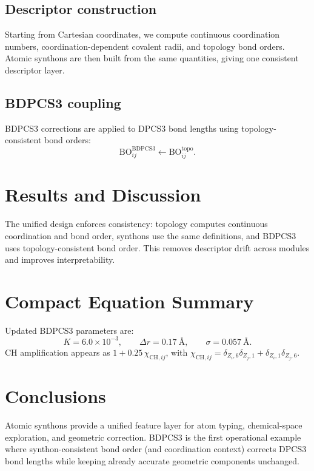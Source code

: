 \documentclass[journal=jctcce,manuscript=article]{achemso}
\begin{document}
\subsection{Descriptor construction}
Starting from Cartesian coordinates, we compute continuous coordination numbers, coordination-dependent covalent radii, and topology bond orders. Atomic synthons are then built from the same quantities, giving one consistent descriptor layer.

\subsection{BDPCS3 coupling}
BDPCS3 corrections are applied to DPCS3 bond lengths using topology-consistent bond orders:
\begin{equation}
\mathrm{BO}_{ij}^{\mathrm{BDPCS3}} \leftarrow \mathrm{BO}_{ij}^{\mathrm{topo}}.
\end{equation}

\section{Results and Discussion}
The unified design enforces consistency: topology computes continuous coordination and bond order, synthons use the same definitions, and BDPCS3 uses topology-consistent bond order. This removes descriptor drift across modules and improves interpretability.

\section{Compact Equation Summary}
Updated BDPCS3 parameters are:
\begin{equation}
K=6.0\times10^{-3},\qquad
\Delta r=0.17~\text{\AA},\qquad
\sigma=0.057~\text{\AA}.
\end{equation}
CH amplification appears as $1+0.25\,\chi_{\mathrm{CH},ij}$, with $\chi_{\mathrm{CH},ij}=\delta_{Z_i,6}\delta_{Z_j,1}+\delta_{Z_i,1}\delta_{Z_j,6}$.

\section{Conclusions}
Atomic synthons provide a unified feature layer for atom typing, chemical-space exploration, and geometric correction. BDPCS3 is the first operational example where synthon-consistent bond order (and coordination context) corrects DPCS3 bond lengths while keeping already accurate geometric components unchanged.
\end{document}
